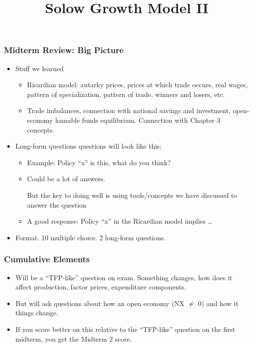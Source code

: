 \documentclass[9pt]{beamer}
\title[NYU Stern] %
{\huge Solow Growth Model II}
\author[Michael Waugh] %
{\bf{\Large}}%
\date[] %
\begin{document}



\begin{frame}[t]
\frametitle{Midterm Review: Big Picture}
\begin{itemize}
\item Stuff we learned
\begin{itemize}
\medskip
\item Ricardian model: autarky prices, prices at which trade occurs, real wages, pattern of specialization, pattern of trade, winners and losers, etc.
\medskip
\item Trade imbalances, connection with national savings and investment, open-economy loanable funds equilibrium. Connection with Chapter 3 concepts. 
\end{itemize}
\bigskip
\item Long-form questions questions will look like this:
\begin{itemize}
\medskip
\item Example: Policy ``x'' is this, what do you think?
\medskip
\item Could be a lot of answers. \begin{alertenv}{But the key to doing well is using tools/concepts we have discussed to answer the question}\end{alertenv}
\medskip
\item A good response: Policy ``x'' in the Ricardian model implies \ldots
\end{itemize}
\medskip
\item Format: 10 multiple choice. 2 long-form questions.
\end{itemize}
\bigskip
\end{frame}



\begin{frame}[t]
\frametitle{Cumulative Elements}
\begin{itemize}
\item Will be a ``TFP-like'' question on exam. Something changes, how does it affect production, factor prices, expenditure components.
\medskip
\item But will ask questions about how an open economy (NX $\neq$ 0) and how it things change. 
\medskip
\item If you score better on this relative to the ``TFP-like'' question on the first midterm, you get the Midterm 2 score. 
\end{itemize}
\end{frame}
\end{document}

